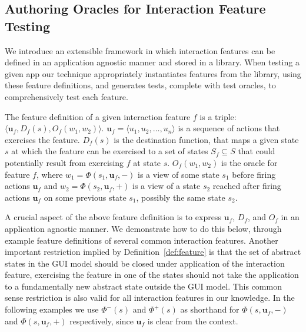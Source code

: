 \subsection{Authoring Oracles for Interaction Feature Testing}
\label{sec:featureDefinition}

We introduce an extensible framework in which interaction features can be defined in an application agnostic manner and stored in a library. When testing a given app our technique appropriately instantiates features from the library, using these feature definitions, and generates tests, complete with test oracles, to comprehensively test each feature.

\begin{mydef}
\label{def:feature}
The feature definition of a given interaction feature $f$ is a triple: $\langle \mathbf{u}_f, D_f(s), O_f(w_1, w_2) \rangle$. %
$\mathbf{u}_f = \langle u_1, u_2, \dots, u_n \rangle$ is a sequence of actions that exercises the feature. $D_f(s)$ is the destination function, that maps a given state $s$ at which the feature can be exercised to a set of states $S_f \subseteq S$ that could potentially result from exercising $f$ at state $s$. $O_f(w_1, w_2)$ is the oracle for feature $f$, where $w_1 = \Phi(s_1, \mathbf{u}_f, -)$ is a view of some state $s_1$
before firing actions $\mathbf{u}_f$ and $w_2=\Phi(s_2, \mathbf{u}_f, +)$ is a view of a state $s_2$ reached after firing actions $\mathbf{u}_f$ on some previous state $s_1$, possibly the same state $s_2$.
\end{mydef}

A crucial aspect of the above feature definition is to express $\mathbf{u}_f$, $D_f$, and $O_f$ in an application agnostic manner. We demonstrate how to do this below, through example feature definitions of several common interaction features. Another important restriction implied by Definition~\ref{def:feature} is that the set of abstract states in the GUI model should be closed under application of the interaction feature, \ie exercising the feature in one of the states should not take the application to a fundamentally new abstract state outside the GUI model. This common sense restriction is also valid for all interaction features in our knowledge. In the following examples we use $\Phi^-(s)$ and $\Phi^+(s)$ as shorthand for $\Phi(s, \mathbf{u}_f, -)$ and $\Phi(s, \mathbf{u}_f, +)$ respectively, since $\mathbf{u}_f$ is clear from the context.

